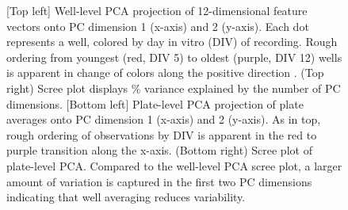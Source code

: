 \documentclass{article}\usepackage[]{graphicx}\usepackage[]{color}
\begin{document}
\begin{figure}
  \centering
  \caption{[Top left] Well-level PCA projection of 12-dimensional
feature vectors onto PC dimension 1 (x-axis) and 2 (y-axis).  Each dot
represents a well, colored by day in vitro (DIV) of recording. Rough
ordering from youngest (red, DIV 5) to oldest (purple, DIV 12)
wells is apparent in change of colors along the positive direction
. (Top right) Scree plot displays \% variance explained by the number
of PC dimensions. [Bottom left] Plate-level PCA projection of plate
averages onto PC dimension 1 (x-axis) and 2 (y-axis).  As in top,
rough ordering of observations by DIV is apparent in the red to purple
transition along the x-axis. (Bottom right) Scree plot of plate-level
PCA. Compared to the well-level PCA scree plot, a larger amount of
variation is captured in the first two PC dimensions indicating that
well averaging reduces variability.
}
\end{figure}
\end{document}
